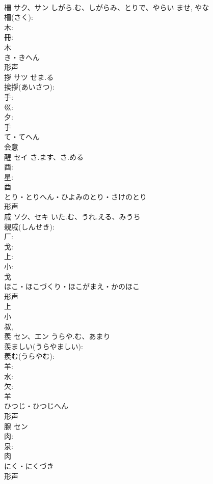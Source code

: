 \documentclass[8pt]{extreport}
\begin{document}
\begin{CJK}{UTF8}{min}
\\	柵	サク、サン	しがら.む、しがらみ、とりで、やらい	ませ, やな	
\\	柵(さく): 
\\	木: 
\\	冊: 
\\	木	
\\	き・きへん	
\\	形声 
\\	拶	サツ	せま.る		
\\	挨拶(あいさつ): 
\\	手: 
\\	巛: 
\\	夕: 
\\	手	
\\	て・てへん	
\\	会意 
\\	醒	セイ	さ.ます、さ.める		
\\	酉: 
\\	星: 
\\	酉	
\\	とり・とりへん・ひよみのとり・さけのとり	
\\	形声 
\\	戚	ソク、セキ	いた.む、うれ.える、みうち		
\\	親戚(しんせき): 
\\	厂: 
\\	戈: 
\\	上: 
\\	小: 
\\	戈	
\\	ほこ・ほこづくり・ほこがまえ・かのほこ	
\\	形声 
\\	上 
\\	小 
\\	叔, 
\\	羨	セン、エン	うらや.む、あまり		
\\	羨ましい(うらやましい): 
\\	羨む(うらやむ): 
\\	羊: 
\\	水: 
\\	欠: 
\\	羊	
\\	ひつじ・ひつじへん	
\\	形声 
\\	腺	セン			
\\	肉: 
\\	泉: 
\\	肉	
\\	にく・にくづき	
\\	形声 

\end{CJK}
\end{document}
